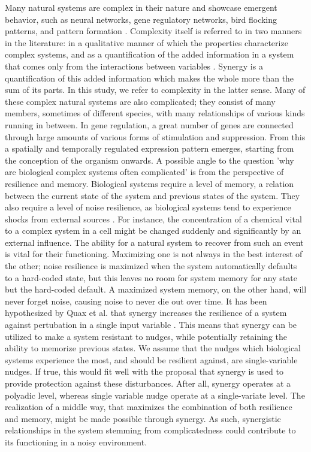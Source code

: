 \documentclass[../main.tex]{subfiles}
\begin{document}
Many natural systems are complex in their nature and showcase emergent behavior, such as neural networks, gene regulatory networks, bird flocking patterns, and pattern formation \cite{choi2001supply, gat1999synergy, kondo2010reaction, liang2008gene}.
Complexity itself is referred to in two manners in the literature: in a qualitative manner of which the properties characterize complex systems, and as a quantification of the added information in a system that comes only from the interactions between variables \cite{bar2004multiscale}.
Synergy is a quantification of this added information which makes the whole more than the sum of its parts.
In this study, we refer to complexity in the latter sense.
Many of these complex natural systems are also complicated; they consist of many members, sometimes of different species, with many relationships of various kinds running in between.
In gene regulation, a great number of genes are connected through large amounts of various forms of stimulation and suppression.
From this a spatially and temporally regulated expression pattern emerges, starting from the conception of the organism onwards.
A possible angle to the question 'why are biological complex systems often complicated' is from the perspective of resilience and memory.
Biological systems require a level of memory, a relation between the current state of the system and previous states of the system. 
They also require a level of noise resilience, as biological systems tend to experience shocks from external sources \cite{peixoto2012emergence}. %
For instance, the concentration of a chemical vital to a complex system in a cell might be changed suddenly and significantly by an external influence.
The ability for a natural system to recover from such an event is vital for their functioning.
Maximizing one is not always in the best interest of the other; noise resilience is maximized when the system automatically defaults to a hard-coded state, but this leaves no room for system memory for any state but the hard-coded default.
A maximized system memory, on the other hand, will never forget noise, causing noise to never die out over time.
It has been hypothesized by Quax et al. that synergy increases the resilience of a system against pertubation in a single input variable \cite{quax2017quantifying}.
This means that synergy can be utilized to make a system resistant to nudges, while potentially retaining the ability to memorize previous states.
We assume that the nudges which biological systems experience the most, and should be resilient against, are single-variable nudges.
If true, this would fit well with the proposal that synergy is used to provide protection against these disturbances.
After all, synergy operates at a polyadic level, whereas single variable nudge operate at a single-variate level.
The realization of a middle way, that maximizes the combination of both resilience and memory, might be made possible through synergy.
As such, synergistic relationships in the system stemming from complicatedness could contribute to its functioning in a noisy environment.
\end{document}
